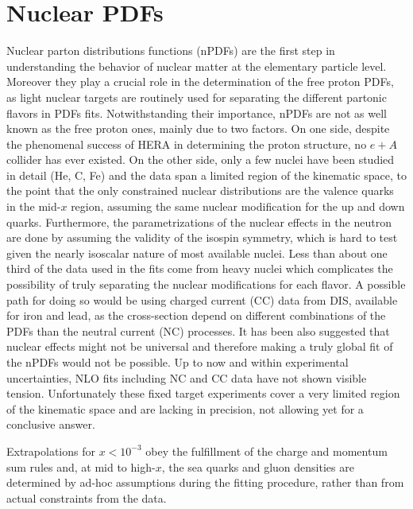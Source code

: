 
\section{Nuclear PDFs\label{sec:nPDFs}}
%
Nuclear parton distributions functions (nPDFs) are the first step in understanding the behavior of nuclear matter at the elementary particle level. Moreover they play a crucial role in the determination of the free proton PDFs, as light nuclear targets are routinely used for separating the different partonic flavors in PDFs fits. Notwithstanding their importance, nPDFs are not as well known as the free proton ones, mainly due to two factors. On one side, despite the phenomenal success of HERA in determining the proton structure, no $e+A$ collider has ever existed. On the other side, only a few nuclei have been studied in detail (He, C, Fe) and the data span a limited region of the kinematic space, to the point that the only constrained nuclear distributions are the valence quarks in the mid-$x$ region, assuming the same nuclear modification for the up and down quarks. Furthermore, the parametrizations of the nuclear effects in the neutron are done by assuming the validity of the isospin symmetry, which is hard to test given the nearly isoscalar nature of most available nuclei.  Less than about one third of the data used in the fits come from heavy nuclei which complicates the possibility of truly separating the nuclear modifications for each flavor. A possible path for doing so would be using charged current (CC) data from DIS, available for iron and lead, as the cross-section depend on different combinations of the PDFs than the neutral current (NC) processes. It has been also suggested that nuclear effects might not be universal and therefore making a truly global fit of the nPDFs would not be possible. Up to now and within experimental uncertainties, NLO fits including NC and CC data have not shown visible tension. Unfortunately these fixed target experiments cover a very limited region of the kinematic space and are lacking in precision, not allowing yet for a conclusive answer.

Extrapolations for $x < 10^{-3}$ obey the fulfillment of the charge and momentum sum rules and, at mid to high-$x$, the sea quarks and gluon densities are determined by ad-hoc assumptions during the fitting procedure, rather than from actual constraints from the data. 

